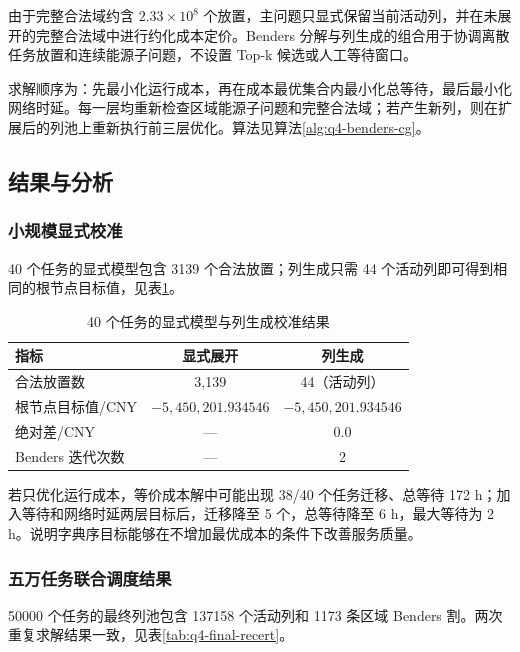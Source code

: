由于完整合法域约含 $2.33\times10^8$ 个放置，主问题只显式保留当前活动列，并在未展开的完整合法域中进行约化成本定价。Benders 分解与列生成的组合用于协调离散任务放置和连续能源子问题\cite{wang_bcg_2026}，不设置 Top-k 候选或人工等待窗口。

求解顺序为：先最小化运行成本，再在成本最优集合内最小化总等待，最后最小化网络时延。每一层均重新检查区域能源子问题和完整合法域；若产生新列，则在扩展后的列池上重新执行前三层优化。算法见算法\ref{alg:q4-benders-cg}。



\subsection{结果与分析}

\subsubsection{小规模显式校准}

40 个任务的显式模型包含 3139 个合法放置；列生成只需 44 个活动列即可得到相同的根节点目标值，见表\ref{tab:q4-40task}。

\begin{table}[!htbp]
\centering
\caption{40 个任务的显式模型与列生成校准结果}
\label{tab:q4-40task}
\begin{tabular}{lcc}
\toprule
\rowcolor{CumcmLightBlue}
指标 & 显式展开 & 列生成 \\
\midrule
合法放置数 & 3,139 & 44（活动列）\\
根节点目标值/CNY & $-5{,}450{,}201.934546$ & $-5{,}450{,}201.934546$ \\
绝对差/CNY & --- & 0.0 \\
Benders 迭代次数 & --- & 2 \\
\bottomrule
\end{tabular}
\end{table}
\FloatBarrier

若只优化运行成本，等价成本解中可能出现 38/40 个任务迁移、总等待 172 h；加入等待和网络时延两层目标后，迁移降至 5 个，总等待降至 6 h，最大等待为 2 h。说明字典序目标能够在不增加最优成本的条件下改善服务质量。

\subsubsection{五万任务联合调度结果}

50000 个任务的最终列池包含 137158 个活动列和 1173 条区域 Benders 割。两次重复求解结果一致，见表\ref{tab:q4-final-recert}。

